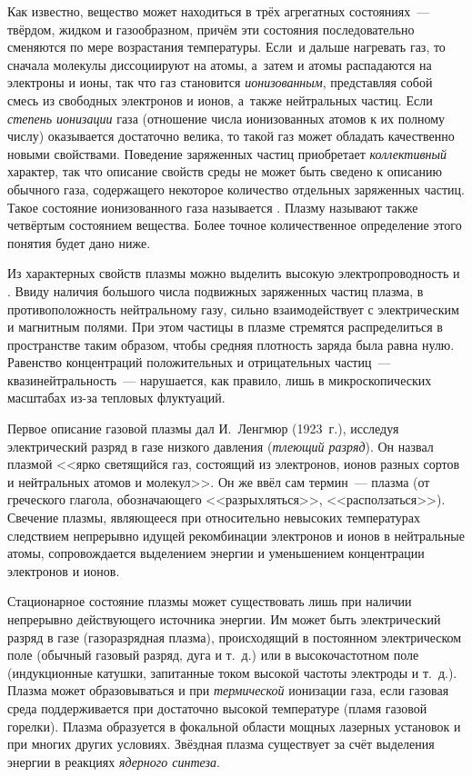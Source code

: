 
Как известно, вещество может находиться в трёх агрегатных состояниях~--- твёрдом,
жидком и газообразном, причём эти
состояния последовательно сменяются по мере возрастания температуры. Если~и
дальше нагревать газ, то сначала молекулы диссоциируют на атомы, а~затем и атомы
распадаются на электроны и ионы, так что газ становится \emph{ионизованным},
представляя собой смесь из свободных электронов и ионов, а~также нейтральных
частиц. Если \emph{степень ионизации} газа
(отношение числа ионизованных атомов к их полному числу) оказывается достаточно велика, то
такой газ может обладать качественно новыми свойствами.
Поведение заряженных частиц приобретает \emph{коллективный} характер, 
так что описание свойств среды не может быть 
сведено к описанию обычного газа, содержащего некоторое количество 
отдельных заряженных частиц.
Такое состояние ионизованного газа называется .
Плазму называют также четвёртым состоянием вещества.
Более точное количественное определение этого понятия будет дано ниже.

Из характерных свойств плазмы можно выделить высокую электропроводность и
. Ввиду наличия большого числа подвижных
заряженных частиц плазма, в противоположность нейтральному газу, сильно
взаимодействует с электрическим и магнитным полями.
При этом частицы в плазме стремятся распределиться в пространстве таким образом,
чтобы средняя плотность заряда была равна нулю. Равенство концентраций
положительных и отрицательных частиц~--- квазинейтральность~--- нарушается, 
как правило, лишь в микроскопических масштабах из-за тепловых флуктуаций.

Первое описание газовой плазмы дал И.~Ленгмюр (1923~г.), исследуя электрический
разряд в газе низкого давления (\emph{тлеющий разряд}). Он назвал плазмой <<ярко
светящийся газ, состоящий из электронов, ионов разных сортов и нейтральных
атомов и молекул>>. Он же ввёл сам термин~--- плазма 
(от греческого глагола, обозначающего <<разрыхляться>>, <<расползаться>>).
Свечение плазмы, являющееся при относительно невысоких температурах 
следствием непрерывно идущей рекомбинации электронов и ионов в нейтральные атомы, 
сопровождается выделением энергии и уменьшением концентрации электронов и ионов. 

Стационарное состояние плазмы может существовать лишь при наличии непрерывно 
действующего источника энергии. Им может быть электрический разряд в газе 
(газоразрядная плазма),
происходящий в постоянном электрическом поле (обычный газовый разряд,
дуга и т.~д.) или в высокочастотном поле (индукционные катушки,
запитанные током высокой частоты электроды и т.~д.).
Плазма может образовываться и при \emph{термической} ионизации газа, 
если газовая среда поддерживается при достаточно высокой температуре 
(пламя газовой горелки). Плазма образуется в фокальной области мощных лазерных 
установок и при многих других условиях. 
Звёздная плазма существует за счёт выделения энергии в реакциях 
\emph{ядерного синтеза}.

